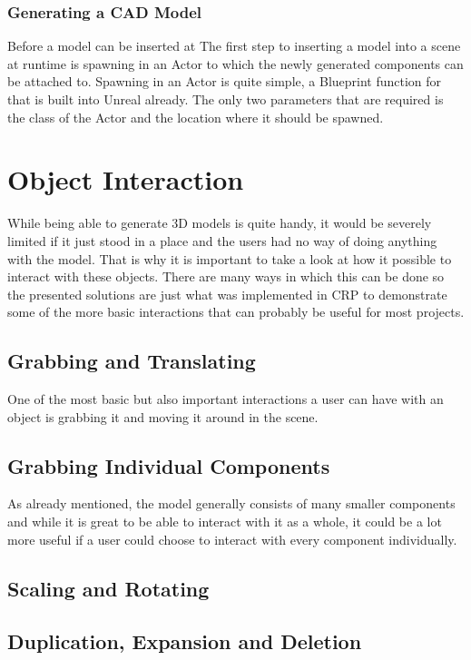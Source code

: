\subsubsection{Generating a CAD Model}

Before a model can be inserted at
The first step to inserting a model into a scene at runtime is spawning in an Actor to which the newly generated components can be attached to. Spawning in an Actor is quite simple, a Blueprint function for that is built into Unreal already. The only two parameters that are required is the class of the Actor and the location where it should be spawned.


\section{Object Interaction}\label{chp:ObjectInteraction}
While being able to generate 3D models is quite handy, it would be severely limited if it just stood in a place and the users had no way of doing anything with the model. That is why it is important to take a look at how it possible to interact with these objects. There are many ways in which this can be done so the presented solutions are just what was implemented in CRP to demonstrate some of the more basic interactions that can probably be useful for most projects. 


\subsection{Grabbing and Translating}

One of the most basic but also important interactions a user can have with an object is grabbing it and moving it around in the scene.

\subsection{Grabbing Individual Components}

As already mentioned, the model generally consists of many smaller components and while it is great to be able to interact with it as a whole, it could be a lot more useful if a user could choose to interact with every component individually.

\subsection{Scaling and Rotating}

\subsection{Duplication, Expansion and Deletion}



